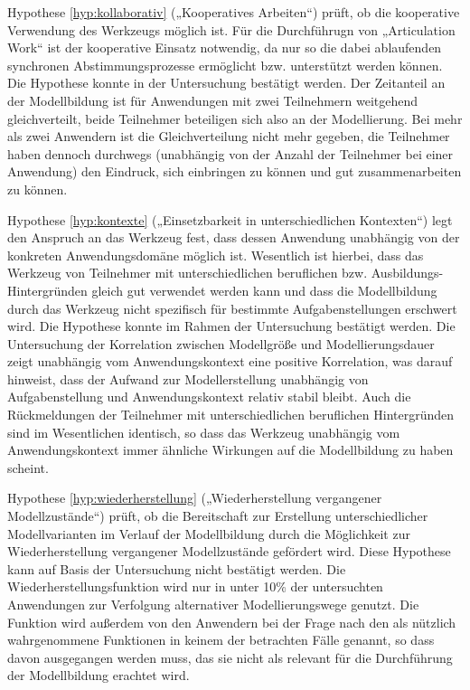 Hypothese \ref{hyp:kollaborativ} („Kooperatives Arbeiten“) prüft, ob die kooperative Verwendung des Werkzeugs möglich ist. Für die Durchführugn von „Articulation Work“ ist der kooperative Einsatz notwendig, da nur so die dabei ablaufenden synchronen Abstimmungsprozesse ermöglicht bzw. unterstützt werden können. Die Hypothese konnte in der Untersuchung bestätigt werden. Der Zeitanteil an der Modellbildung ist für Anwendungen mit zwei Teilnehmern weitgehend gleichverteilt, beide Teilnehmer beteiligen sich also an der Modellierung. Bei mehr als zwei Anwendern ist die Gleichverteilung nicht mehr gegeben, die Teilnehmer haben dennoch durchwegs (unabhängig von der Anzahl der Teilnehmer bei einer Anwendung) den Eindruck, sich einbringen zu können und gut zusammenarbeiten zu können.

Hypothese \ref{hyp:kontexte} („Einsetzbarkeit in unterschiedlichen Kontexten“) legt den Anspruch an das Werkzeug fest, dass dessen Anwendung unabhängig von der konkreten Anwendungsdomäne möglich ist. Wesentlich ist hierbei, dass das Werkzeug von Teilnehmer mit unterschiedlichen beruflichen bzw. Ausbildungs-Hintergründen gleich gut verwendet werden kann und dass die Modellbildung durch das Werkzeug nicht spezifisch für bestimmte Aufgabenstellungen erschwert wird. Die Hypothese konnte im Rahmen der Untersuchung bestätigt werden. Die Untersuchung der Korrelation zwischen Modellgröße und Modellierungsdauer zeigt unabhängig vom Anwendungskontext eine positive Korrelation, was darauf hinweist, dass der Aufwand zur Modellerstellung unabhängig von Aufgabenstellung und Anwendungskontext relativ stabil bleibt. Auch die Rückmeldungen der Teilnehmer mit unterschiedlichen beruflichen Hintergründen sind im Wesentlichen identisch, so dass das Werkzeug unabhängig vom Anwendungskontext immer ähnliche Wirkungen auf die Modellbildung zu haben scheint. 

Hypothese \ref{hyp:wiederherstellung} („Wiederherstellung vergangener Modellzustände“) prüft, ob die Bereitschaft zur Erstellung unterschiedlicher Modellvarianten im Verlauf der Modellbildung durch die Möglichkeit zur Wiederherstellung vergangener Modellzustände gefördert wird. Diese Hypothese kann auf Basis der Untersuchung nicht bestätigt werden. Die Wiederherstellungsfunktion wird nur in unter 10\% der untersuchten Anwendungen zur Verfolgung alternativer Modellierungswege genutzt. Die Funktion wird außerdem von den Anwendern bei der Frage nach den als nützlich wahrgenommene Funktionen in keinem der betrachten Fälle genannt, so dass davon ausgegangen werden muss, das sie nicht als relevant für die Durchführung der Modellbildung erachtet wird.

